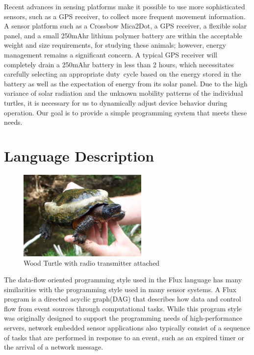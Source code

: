 \documentclass[letterpaper,times,twocolumn,10pt]{article}
\begin{document}
{Recent advances in sensing platforms make it possible to use more
sophisticated sensors, such as a GPS receiver, to collect more
frequent movement information.  A sensor platform such as a Crossbow
Mica2Dot, a GPS receiver, a flexible solar panel, and
a small 250mAhr lithium polymer battery are within the acceptable
weight and size requirements, for studying these animals; however,
energy management remains a significant concern.  A typical GPS
receiver will completely drain a 250mAhr battery in less than 2 hours,
which necessitates carefully selecting an appropriate duty~cycle based
on the energy stored in the battery as well as the expectation of
energy from its solar panel.  Due to the high variance of solar
radiation and the unknown mobility patterns of the individual turtles,
it is necessary for us to dynamically adjust device behavior during
operation.  Our goal is to provide a simple programming system that
meets these needs.





\section*{Language Description}

\begin{figure}[t]
\centering
\includegraphics[width=2.5in]{fig/turtle}
\caption{Wood Turtle with radio transmitter attached}
\label{fig:turtle}
\end{figure}

The data-flow oriented programming style used in the Flux\cite{flux}
language has many similarities with the programming style used in many
sensor systems.  A Flux program is a directed acyclic graph(DAG) that
describes how data and control flow from event sources through
computational tasks.  While this program style was originally
designed to support the programming needs of high-performance servers,
network embedded sensor applications also typically consist of a
sequence of tasks that are performed in response to an event, such as
an expired timer or the arrival of a network message.


}
\end{document}
